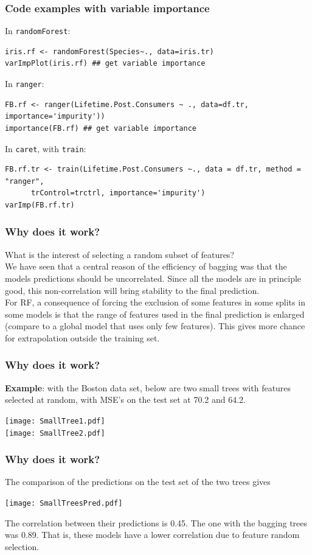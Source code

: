 \begin{frame}[fragile]
\frametitle{Code examples with variable importance}
\scriptsize
In {\tt randomForest}:
\begin{verbatim}
iris.rf <- randomForest(Species~., data=iris.tr) 
varImpPlot(iris.rf) ## get variable importance
\end{verbatim}
In {\tt ranger}:
\begin{verbatim}
FB.rf <- ranger(Lifetime.Post.Consumers ~ ., data=df.tr, importance='impurity'))
importance(FB.rf) ## get variable importance
\end{verbatim}
In {\tt caret}, with {\tt train}:
\begin{verbatim}
FB.rf.tr <- train(Lifetime.Post.Consumers ~., data = df.tr, method = "ranger",
      trControl=trctrl, importance='impurity')			
varImp(FB.rf.tr)
\end{verbatim}
\end{frame}
\begin{frame}
\frametitle{Why does it work?}
What is the interest of selecting a random subset of features?\\
\vspace{0.3cm}
We have seen that a central reason of the efficiency of bagging was that the models predictions should be uncorrelated. Since all the models are in principle good, this non-correlation will bring stability to the final prediction.\\
\vspace{0.3cm}
For RF, a consequence of forcing the exclusion of some features in some splits in some models is that the range of features used in the final prediction is enlarged (compare to a global model that uses only few features). This gives more chance for extrapolation outside the training set.
\end{frame}
\begin{frame}
\frametitle{Why does it work?}
{\bf Example}: with the Boston data set, below are two small trees with features selected at random, with MSE's on the test set at 70.2 and 64.2.
\vspace{-1cm}
\begin{center}
\texttt{[image: SmallTree1.pdf]}\\
\vspace{-3cm}
\texttt{[image: SmallTree2.pdf]}
\end{center}
\end{frame}
\begin{frame}
\frametitle{Why does it work?}
The comparison of the predictions on the test set of the two trees gives
\begin{center}
\texttt{[image: SmallTreesPred.pdf]}
\end{center}
The correlation between their predictions is 0.45. The one with the bagging trees was 0.89. That is, these models have a lower correlation due to feature random selection.
\end{frame}
